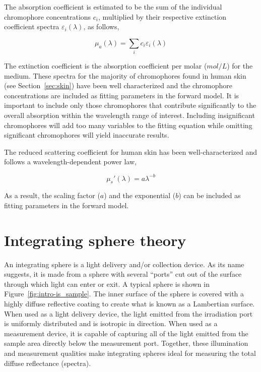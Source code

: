 The absorption coefficient is estimated to be the sum of the individual chromophore concentrations $c_i$, multiplied by their respective extinction coefficient spectra $\varepsilon_i(\lambda)$, as follows,

\begin{equation}
\mu_a(\lambda) = \sum_i c_i \varepsilon_i(\lambda)
\end{equation}

The extinction coefficient is the absorption coefficient per molar ($mol/L$) for the medium. These spectra for the majority of chromophores found in human skin (see Section~\ref{sec:skin}) have been well characterized and the chromophore concentrations are included as fitting parameters in the forward model. It is important to include only those chromophores that contribute significantly to the overall absorption within the wavelength range of interest. Including insignificant chromophores will add too many variables to the fitting equation while omitting significant chromophores will yield inaccurate results.

The reduced scattering coefficient for human skin has been well-characterized and follows a wavelength-dependent power law,\cite{Doornbos1999}

\begin{equation}
\mu_s'(\lambda) = a\lambda^{-b}
\end{equation}

As a result, the scaling factor ($a$) and the exponential ($b$) can be included as fitting parameters in the forward model.

\section{Integrating sphere theory}
\label{sec:is_theory}
An integrating sphere is a light delivery and/or collection device. As its name suggests, it is made from a sphere with several ``ports'' cut out of the surface through which light can enter or exit. A typical sphere is shown in Figure~\ref{fig:intro-is_sample}. The inner surface of the sphere is covered with a highly diffuse reflective coating to create what is known as a Lambertian surface. When used as a light delivery device, the light emitted from the irradiation port is uniformly distributed and is isotropic in direction. When used as a measurement device, it is capable of capturing all of the light emitted from the sample area directly below the measurement port. Together, these illumination and measurement qualities make integrating spheres ideal for measuring the total diffuse reflectance (spectra).

